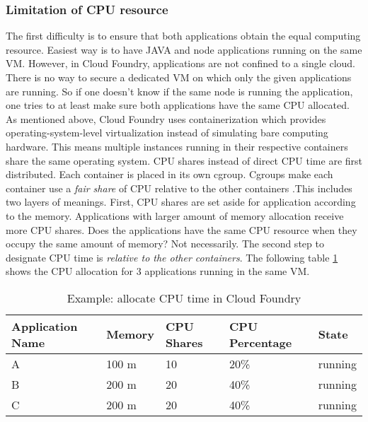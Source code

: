 \subsubsection{Limitation of CPU resource}
\label{cpu limitation}
The first difficulty is to ensure that both applications obtain the equal computing resource. Easiest way is to have JAVA and node applications running on the same VM. However, in Cloud Foundry, applications are not confined to a single cloud. There is no way to secure a dedicated VM on which only the given applications are running. So if one doesn't know if the same node is running the application, one tries to at least make sure both applications have the same CPU allocated. As mentioned above, Cloud Foundry uses containerization which provides operating-system-level virtualization instead of simulating bare computing hardware. This means multiple instances running in their respective containers share the same operating system. CPU shares instead of direct CPU time are first distributed. Each container is placed in its own cgroup. Cgroups make each container use a \textit{fair share} of CPU relative to the other containers \citep{CGroup}.This includes two layers of meanings. First, CPU shares are set aside for application according to the memory. Applications with larger amount of memory allocation receive more CPU shares. Does the applications have the same CPU resource when they occupy the same amount of memory? Not necessarily. The second step to designate CPU time is \textit{relative to the other containers}. The following table \ref{CPU time in Cloud Foundry} shows the CPU allocation for 3 applications running in the same VM. 
\begin{table}[h]
	\caption{Example: allocate CPU time in Cloud Foundry}
	\label{CPU time in Cloud Foundry}
	\renewcommand{\arraystretch}{1.2}
	\centering
	\sffamily
	\begin{footnotesize}
		\begin{tabular}{l l l l l }
			\toprule
			\textbf{Application Name} & \textbf{Memory} & \textbf{CPU Shares}& \textbf{CPU Percentage} }& \textbf{State}\\
			\midrule
		    A 	&	100	m & 10 & 20\%   & running\\
			B	&	200 m & 20 & 40\% & running\\
			C	&	200 m &	20 & 40\% & running\\
			\bottomrule
		\end{tabular}
	\end{footnotesize}
	\rmfamily
\end{table}

